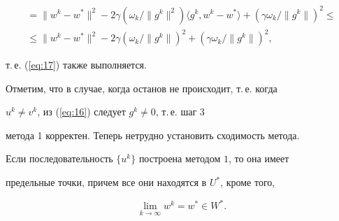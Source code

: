 \begin{pf}
\begin{multline*}
= \| w^{k} - w^{*} \|^{2} - 2 \gamma(\omega_{k} / \| g^{k} \|^{2})


\langle g^{k},w^{k}-w^{*}\rangle+(\gamma \omega_{k} / \| g^{k} \|)^{2}\le \\


%


\leq \| w^{k} - w^{*} \|^{2} - 2 \gamma(\omega_{k} / \| g^{k} \|)^{2} 


+(\gamma \omega_{k} / \| g^{k} \|)^{2}, 


\end{multline*}


т.\,е. (\ref{eq:17}) также выполняется.


\end{pf}





Отметим, что в случае, когда останов не происходит, т.\,е. когда 


$u^{k} \neq v^{k}$, из (\ref{eq:16}) следует $g^{k} \neq 0$, т.\,е. шаг 3 


метода 1 корректен. Теперь нетрудно установить сходимость метода.








\begin{thm} \label{thm:1}


Если последовательность $\{ u^{k}\}$ построена методом $1$, то она имеет 


предельные точки, причем все они находятся в $U^{*} $, кроме того,


\begin{equation} \label{eq:18} 


\lim_{k \to \infty } w^{k}=w^{*} \in W^{*}.


\end{equation}


\end{thm}





